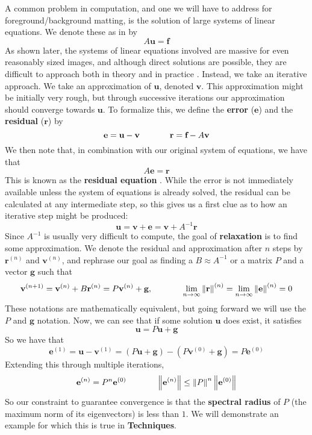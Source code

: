 A common problem in computation, and one we will have to address for foreground/background matting, is the solution of large systems of linear equations. We denote these as in \cite{briggs87} by
\[A\textbf{u}=\textbf{f}\]
As shown later, the systems of linear equations involved are massive for even reasonably sized images, and although direct solutions are possible, they are difficult to approach both in theory \cite[pg.4]{briggs87} and in practice \cite{lee14}. Instead, we take an iterative approach. We take an approximation of $\textbf{u}$, denoted $\textbf{v}$. This approximation might be initially very rough, but through successive iterations our approximation should converge towards $\textbf{u}$. To formalize this, we define the \textbf{error} ($\textbf{e}$) and the \textbf{residual} ($\textbf{r}$) by
\[\textbf{e}=\textbf{u}-\textbf{v}\hspace{.5in}
  \textbf{r}=\textbf{f}-A\textbf{v}\]
We then note that, in combination with our original system of equations, we have that
\[A\textbf{e}=\textbf{r}\]
This is known as the \textbf{residual equation} \cite{briggs87}. While the error is not immediately available unless the system of equations is already solved, the residual can be calculated at any intermediate step, so this gives us a first clue as to how an iterative step might be produced:
\[\textbf{u}=\textbf{v}+\textbf{e}=
	\textbf{v}+A^{-1}\textbf{r}\]
Since $A^{-1}$ is usually very difficult to compute, the goal of \textbf{relaxation} is to find some approximation. We denote the residual and approximation after $n$ steps by $\textbf{r}^{(n)}$ and $\textbf{v}^{(n)}$, and rephrase our goal as finding a $B\approx A^{-1}$ or a matrix $P$ and a vector $\textbf{g}$ such that
\[\textbf{v}^{(n+1)}=\textbf{v}^{(n)}+B\textbf{r}^{(n)}
	=P\textbf{v}^{(n)}+\textbf{g},
\hspace{.5in}
	\lim\limits_{n\to\infty}
		\left\Vert\textbf{r}\right\Vert^{(n)}=
	\lim\limits_{n\to\infty}
	\left\Vert\textbf{e}\right\Vert^{(n)}=0\]
These notations are mathematically equivalent, but going forward we will use the $P$ and $\textbf{g}$ notation. Now, we can see that if some solution $\textbf{u}$ does exist, it satisfies
\[\textbf{u}=P\textbf{u}+\textbf{g}\]
So we have that
\[\textbf{e}^{(1)}=\textbf{u}-\textbf{v}^{(1)}
=(P\textbf{u}+\textbf{g})-(P\textbf{v}^{(0)}+\textbf{g})
=P\textbf{e}^{(0)}\]
Extending this through multiple iterations,
\[\textbf{e}^{(n)}=P^n\textbf{e}^{(0)}\hspace{.5in}
\left\Vert\textbf{e}^{(n)}\right\Vert\leq
\left\Vert P\right\Vert^n
	\left\Vert\textbf{e}^{(0)}\right\Vert\]
So our constraint to guarantee convergence is that the \textbf{spectral radius} of $P$ (the maximum norm of its eigenvectors) is less than $1$. We will demonstrate an example for which this is true in \textbf{Techniques}.